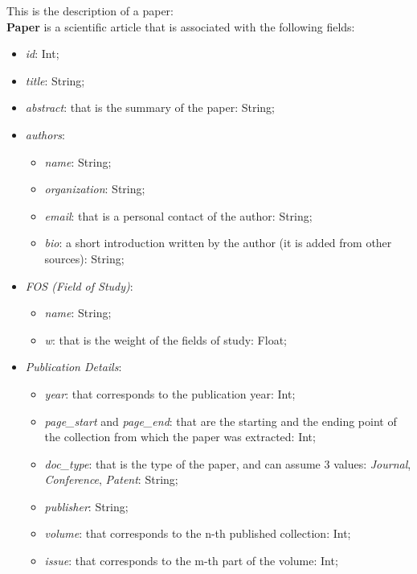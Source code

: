 \documentclass{Configuration_Files/PoliMi3i_thesis}
\begin{document}
This is the description of a paper:\\
\textbf{Paper} is a scientific article that is associated with the following fields:
    \begin{itemize}
        \item \textit{id}: Int;
        \item \textit{title}: String;
        \item \textit{abstract}: that is the summary of the paper: String;
        \item \textit{authors}:
            \begin{itemize}
              \item \textit{name}: String;
              \item \textit{organization}: String;
               \item \textit{email}: that is a personal contact of the author: String;
               \item \textit{bio}: a short introduction written by the author (it is added from other sources): String;
            \end{itemize}
        \item \textit{FOS (Field of Study)}:
            \begin{itemize}
              \item \textit{name}: String;
              \item \textit{w}:  that is the weight of the fields of study: Float;
            \end{itemize}
        \item \textit{Publication Details}:
            \begin{itemize}
              \item \textit{year}: that corresponds to the publication year: Int;
              \item \textit{page\_start} and \textit{page\_end}: that are the starting and the ending point of the collection from which the paper was extracted: Int;
              \item \textit{doc\_type}: that is the type of the paper, and can assume 3 values: \textit{Journal}, \textit{Conference}, \textit{Patent}: String;
                \item \textit{publisher}: String;
              \item \textit{volume}: that corresponds to the n-th published collection: Int;
              \item \textit{issue}: that corresponds to the m-th part of the volume: Int;

\end{itemize}
\end{itemize}
\end{document}
